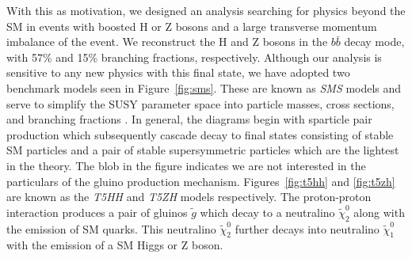 With this as motivation, we designed an analysis searching for physics beyond the SM in events with boosted H or Z bosons and a large transverse momentum imbalance of the event. We reconstruct the H and Z bosons in the $b\bar{b}$ decay mode, with 57\% and 15\% branching fractions, respectively. Although our analysis is sensitive to any new physics with this final state, we have adopted two benchmark models seen in Figure~\ref{fig:sms}. These are known as \textit{SMS} models and serve to simplify the SUSY parameter space into particle masses, cross sections, and branching fractions \cite{CMS-SUS-11-016}. In general, the diagrams begin with sparticle pair production which subsequently cascade decay to final states consisting of stable SM particles and a pair of stable supersymmetric particles which are the lightest in the theory. The blob in the figure indicates we are not interested in the particulars of the gluino production mechanism. Figures~\ref{fig:t5hh} and \ref{fig:t5zh} are known as the \textit{T5HH} and \textit{T5ZH} models respectively. The proton-proton interaction produces a pair of gluinos $\tilde{g}$ which decay to a neutralino $\tilde{\chi}_{2}^{0}$ along with the emission of SM quarks. This neutralino $\tilde{\chi}_{2}^{0}$ further decays into neutralino $\tilde{\chi}_{1}^{0}$ with the emission of a SM Higgs or Z boson.

